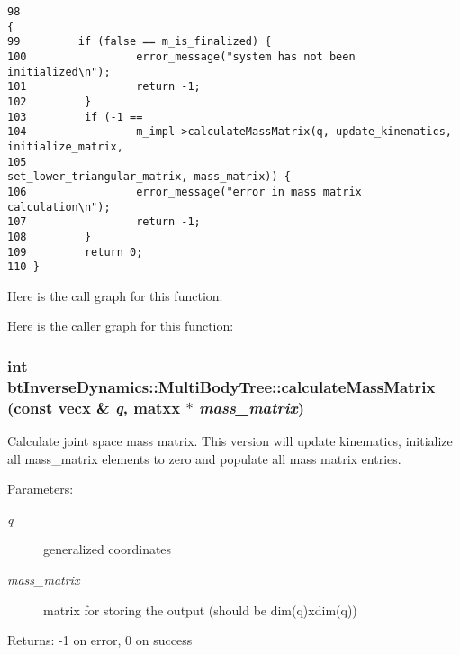 \begin{Code}\begin{verbatim}98                                                                                                                                        {
99         if (false == m_is_finalized) {
100                 error_message("system has not been initialized\n");
101                 return -1;
102         }
103         if (-1 ==
104                 m_impl->calculateMassMatrix(q, update_kinematics, initialize_matrix,
105                                                                         set_lower_triangular_matrix, mass_matrix)) {
106                 error_message("error in mass matrix calculation\n");
107                 return -1;
108         }
109         return 0;
110 }
\end{verbatim}
\end{Code}




Here is the call graph for this function:

Here is the caller graph for this function:\hypertarget{classbt_inverse_dynamics_1_1_multi_body_tree_07b710ad4cbbe4cdadd8e2b5ad7c854a}{
\subsubsection[calculateMassMatrix]{\setlength{\rightskip}{0pt plus 5cm}int btInverseDynamics::MultiBodyTree::calculateMassMatrix (const vecx \& {\em q}, \/  matxx $\ast$ {\em mass\_\-matrix})}}
\label{classbt_inverse_dynamics_1_1_multi_body_tree_07b710ad4cbbe4cdadd8e2b5ad7c854a}


Calculate joint space mass matrix. This version will update kinematics, initialize all mass\_\-matrix elements to zero and populate all mass matrix entries. \begin{Desc}
\item[Parameters:]
\begin{description}
\item[{\em q}]generalized coordinates \item[{\em mass\_\-matrix}]matrix for storing the output (should be dim(q)xdim(q)) \end{description}
\end{Desc}
\begin{Desc}
\item[Returns:]-1 on error, 0 on success \end{Desc}


